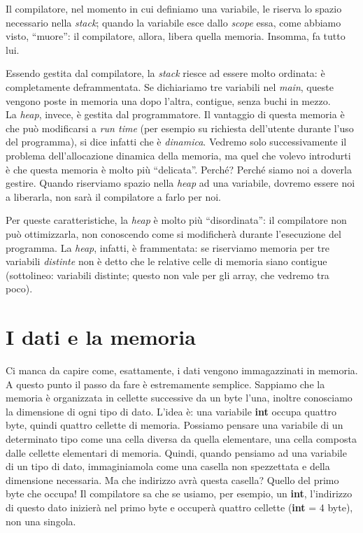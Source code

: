 	Il compilatore, nel momento in cui definiamo una variabile, le riserva lo spazio necessario nella \emph{stack}; quando la variabile esce dallo \emph{scope} essa, come abbiamo visto, ``muore'': il compilatore, allora, libera quella memoria. Insomma, fa tutto lui.
	
	Essendo gestita dal compilatore, la \emph{stack} riesce ad essere molto ordinata: è completamente deframmentata. Se dichiariamo tre variabili nel \emph{main}, queste vengono poste in memoria una dopo l'altra, contigue, senza buchi in mezzo.\\
	
	La \emph{heap}, invece, è gestita dal programmatore. Il vantaggio di questa memoria è che può modificarsi a \emph{run time} (per esempio su richiesta dell'utente durante l'uso del programma), si dice infatti che è \emph{dinamica}. Vedremo solo successivamente il problema dell'allocazione dinamica della memoria, ma quel che volevo introdurti è che questa memoria è molto più ``delicata''. Perché? Perché siamo noi a doverla gestire. Quando riserviamo spazio nella \emph{heap} ad una variabile, dovremo essere noi a liberarla, non sarà il compilatore a farlo per noi.
	
	Per queste caratteristiche, la \emph{heap} è molto più ``disordinata'': il compilatore non può ottimizzarla, non conoscendo come si modificherà durante l'esecuzione del programma. La \emph{heap}, infatti, è frammentata: se riserviamo memoria per tre variabili \emph{distinte} non è detto che le relative celle di memoria siano contigue (sottolineo: variabili distinte; questo non vale per gli array, che vedremo tra poco).
	
	\section{I dati e la memoria} 
	Ci manca da capire come, esattamente, i dati vengono immagazzinati in memoria. A questo punto il passo da fare è estremamente semplice. Sappiamo che la memoria è organizzata in cellette successive da un byte l'una, inoltre conosciamo la dimensione di ogni tipo di dato. L'idea è: una variabile \textbf{int} occupa quattro byte, quindi quattro cellette di memoria. Possiamo pensare una variabile di un determinato tipo come una cella diversa da quella elementare, una cella composta dalle cellette elementari di memoria. Quindi, quando pensiamo ad una variabile di un tipo di dato, immaginiamola come una casella non spezzettata e della dimensione necessaria. Ma che indirizzo avrà questa casella? Quello del primo byte che occupa! Il compilatore sa che se usiamo, per esempio, un \textbf{int}, l'indirizzo di questo dato inizierà nel primo byte e occuperà quattro cellette (\textbf{int} = 4 byte), non una singola. \\
	
